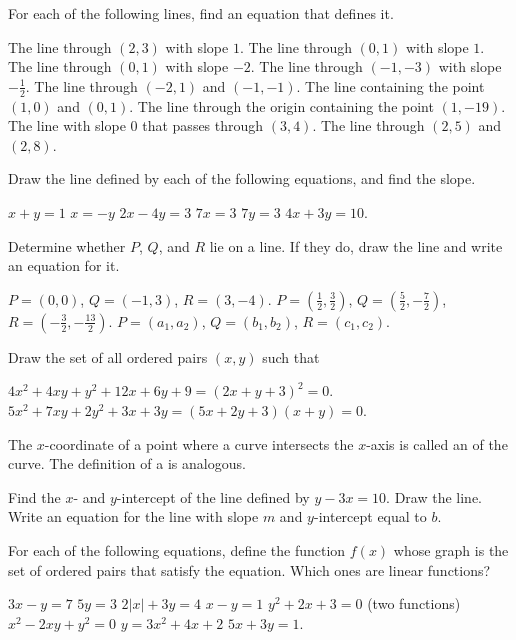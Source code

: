 \begin{exercises}

For each of the following lines, find an equation that defines it.
\begin{exenum}
\sx
The line through $(2,3)$ with slope $1$.
\sx
The line through $(0,1)$ with slope $1$.
\sx
The line through $(0,1)$ with slope $-2$.
\sx
The line through $(-1, -3)$ with slope $-\frac12$.
\sx
The line through $(-2, 1)$ and $(-1,-1)$.
\sx
The line containing the point $(1, 0)$ and $(0,1)$.
\sx
The line through the origin containing the point $(1, -19)$.
\sx
The line with slope $0$ that passes through $(3, 4)$.
\sx
The line through $(2, 5)$ and $(2, 8)$.
\end{exenum}

Draw the line defined by each of the following equations, and find the slope.
\begin{exenum}
\sx
$x+y=1$
\sx
$x=-y$
\sx
$2x-4y=3$
\sx
$7x=3$
\sx
$7y=3$
\sx
$4x + 3y = 10$.
\end{exenum}

Determine whether $P$, $Q$, and $R$ lie on a line.
If they do, draw the line and write an equation for it.
\begin{exenum}
\sx
$P = (0,0)$, $Q = (-1, 3)$, $R = (3, -4)$.
\sx
$P = (\frac12,\frac32)$, $Q = (\frac52, -\frac72)$, 
$R = (-\frac32, -\frac{13}2)$.
\sx
$P = (a_1,a_2)$, $Q = (b_1, b_2)$, $R = (c_1, c_2)$.
\end{exenum}

Draw the set of all ordered pairs $(x,y)$ such that
\begin{exenum}
\sx
$4x^2 + 4xy + y^2 + 12x + 6y + 9 = (2x + y + 3)^2 = 0$.
\sx
$5x^2 + 7xy + 2y^2 + 3x + 3y = (5x + 2y + 3)(x + y)= 0$.
\end{exenum}

The $x$-coordinate of a point where a curve intersects the $x$-axis is called
an  of the curve.
The definition of a  is analogous.
\begin{exenum}
\sx
Find the $x$- and $y$-intercept of the line defined by $y-3x=10$.
Draw the line.
\sx
Write an equation for the line with slope $m$ and $y$-intercept equal to $b$.
\end{exenum}

For each of the following equations, define the function $f(x)$
whose graph is the set of ordered pairs that satisfy the equation.
Which ones are linear functions?
\begin{exenum}
\sx
$3x-y=7$
\sx
$5y=3$
\sx
$2|x| + 3y= 4$
\sx
$x-y=1$
\sx
$y^2 + 2x +3=0$ (two functions)
\sx
$x^2 - 2xy + y^2 = 0$
\sx
$y = 3x^2 + 4x +2$
\sx
$5x + 3y = 1$.
\end{exenum}


\end{exercises}
